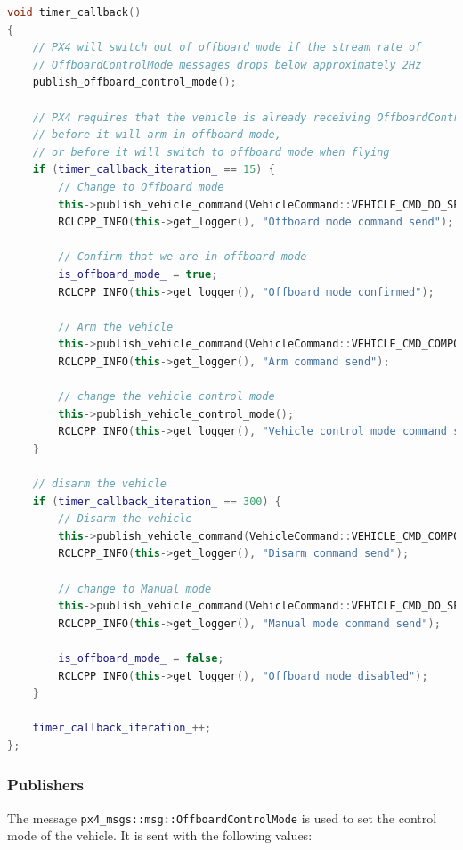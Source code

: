 \documentclass[a4paper]{article}
\begin{document}
\begin{lstlisting}[language=C++, caption=State machine / Timer callback]
void timer_callback()
{
    // PX4 will switch out of offboard mode if the stream rate of 
    // OffboardControlMode messages drops below approximately 2Hz
    publish_offboard_control_mode();

    // PX4 requires that the vehicle is already receiving OffboardControlMode messages 
    // before it will arm in offboard mode, 
    // or before it will switch to offboard mode when flying
    if (timer_callback_iteration_ == 15) {
        // Change to Offboard mode
        this->publish_vehicle_command(VehicleCommand::VEHICLE_CMD_DO_SET_MODE, 1, 6);
        RCLCPP_INFO(this->get_logger(), "Offboard mode command send");

        // Confirm that we are in offboard mode
        is_offboard_mode_ = true;
        RCLCPP_INFO(this->get_logger(), "Offboard mode confirmed");

        // Arm the vehicle
        this->publish_vehicle_command(VehicleCommand::VEHICLE_CMD_COMPONENT_ARM_DISARM, 1.0);
        RCLCPP_INFO(this->get_logger(), "Arm command send");

        // change the vehicle control mode
        this->publish_vehicle_control_mode();
        RCLCPP_INFO(this->get_logger(), "Vehicle control mode command send");
    }

    // disarm the vehicle
    if (timer_callback_iteration_ == 300) {
        // Disarm the vehicle
        this->publish_vehicle_command(VehicleCommand::VEHICLE_CMD_COMPONENT_ARM_DISARM, 0.0);
        RCLCPP_INFO(this->get_logger(), "Disarm command send");

        // change to Manual mode
        this->publish_vehicle_command(VehicleCommand::VEHICLE_CMD_DO_SET_MODE, 1, 1);
        RCLCPP_INFO(this->get_logger(), "Manual mode command send");

        is_offboard_mode_ = false;
        RCLCPP_INFO(this->get_logger(), "Offboard mode disabled");
    }

    timer_callback_iteration_++;
};
\end{lstlisting}

\subsubsection{Publishers}

The message \verb|px4_msgs::msg::OffboardControlMode| is used to set the control mode of the vehicle. 
It is sent with the following values: 
\end{document}
